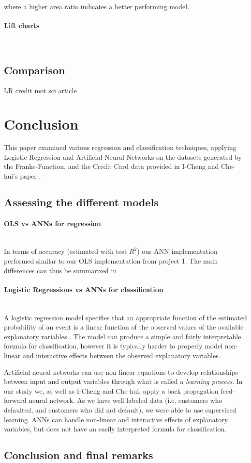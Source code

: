 \documentclass[10pt, a4paper, twocolumn]{article}
\newcommand{\myparagraph}[1]{\paragraph{#1}\mbox{}\\}
\begin{document}
			where a higher area ratio indicates a better performing model.
		\myparagraph{Lift charts}
			
	\subsection{Comparison }
	LR credit mot sci article
\section{Conclusion}
	This paper examined various regression and classification techniques, applying Logistic Regression and Artificial Neural Networks on the datasets generated by the Franke-Function, and the Credit Card data provided in I-Cheng and Che-hui's paper \cite{ScientificArticle}. 
	
	\subsection{Assessing the different models}
		\myparagraph{OLS vs ANNs for regression}
			In terms of accuracy (estimated with test $R^2$) our ANN implementation performed similar to our OLS implementation from project 1\cite{Project1}. The main differences can thus be summarized in 
		\myparagraph{Logistic Regressions vs ANNs for classification}
		
		
		A logistic regression model specifies that an appropriate function of the estimated probability of an event is a linear function of the observed values of the available explanatory variables \cite{Scientific Article}. The model can produce a simple and fairly interpretable formula for classification, however it is typically harder to properly model non-linear and interactive effects between the observed explanatory variables.
		
		Artificial neural networks can use non-linear equations to develop relationships between input and output variables through what is called a \emph{learning process}. In our study we, as well as I-Cheng and Che-hui\cite{Scientific Article}, apply a back propagation feed-forward neural network. As we have well labeled data (i.e. customers who defaulted, and customers who did not default), we were able to use supervised learning. ANNs can handle non-linear and interactive effects of explanatory variables, but does not have an easily interpreted formula for classification.
		
	\subsection{Conclusion and final remarks}
		
\end{document}
